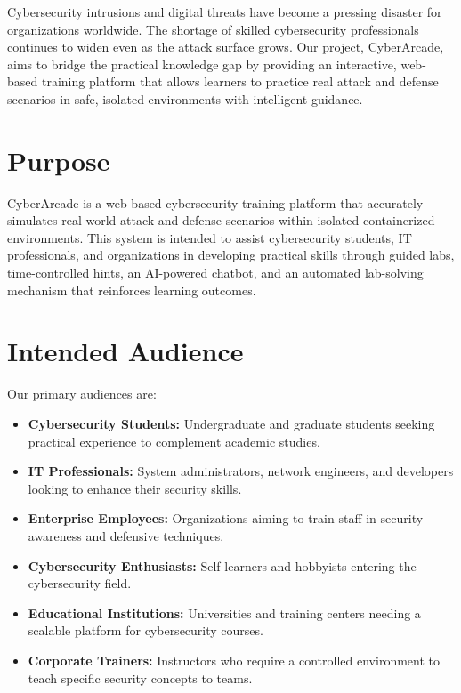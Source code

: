 \documentclass[12pt,a4paper]{report}
\begin{document}
Cybersecurity intrusions and digital threats have become a pressing disaster for organizations
worldwide. The shortage of skilled cybersecurity professionals continues to widen even as the attack
surface grows. Our project, CyberArcade, aims to bridge the practical knowledge gap by providing an
interactive, web-based training platform that allows learners to practice real attack and defense
scenarios in safe, isolated environments with intelligent guidance.

\section{Purpose}

CyberArcade is a web-based cybersecurity training platform that accurately simulates real-world attack
and defense scenarios within isolated containerized environments. This system is intended to assist
cybersecurity students, IT professionals, and organizations in developing practical skills through
guided labs, time-controlled hints, an AI-powered chatbot, and an automated lab-solving mechanism that
reinforces learning outcomes.

\section{Intended Audience}

Our primary audiences are:
\begin{itemize}
  \item \textbf{Cybersecurity Students:} Undergraduate and graduate students seeking practical experience to complement academic studies.
  \item \textbf{IT Professionals:} System administrators, network engineers, and developers looking to enhance their security skills.
  \item \textbf{Enterprise Employees:} Organizations aiming to train staff in security awareness and defensive techniques.
  \item \textbf{Cybersecurity Enthusiasts:} Self-learners and hobbyists entering the cybersecurity field.
  \item \textbf{Educational Institutions:} Universities and training centers needing a scalable platform for cybersecurity courses.
  \item \textbf{Corporate Trainers:} Instructors who require a controlled environment to teach specific security concepts to teams.
\end{itemize}
\end{document}
